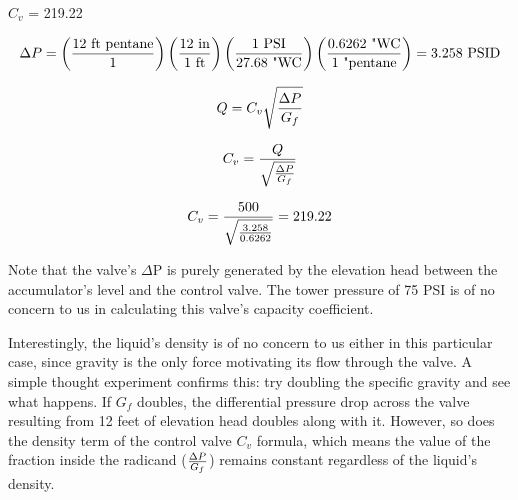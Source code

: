 





$C_v$ = 219.22
 






$$\Delta P = \left(12 \hbox{ ft pentane} \over 1 \right)  \left(12 \hbox{ in} \over 1 \hbox{ ft}\right)  \left(1 \hbox{ PSI} \over 27.68 \hbox{ "WC}\right)  \left(0.6262 \hbox{ "WC} \over 1 \hbox{ "pentane}\right) = 3.258 \hbox{ PSID}$$

$$Q = C_v \sqrt{\Delta P \over G_f}$$

$$C_v = {Q \over \sqrt{\Delta P \over G_f}}$$

$$C_v = {500 \over \sqrt{3.258 \over 0.6262}} = 219.22$$

\vskip 10pt


Note that the valve's $\Delta$P is purely generated by the elevation head between the accumulator's level and the control valve.  The tower pressure of 75 PSI is of no concern to us in calculating this valve's capacity coefficient.

Interestingly, the liquid's density is of no concern to us either in this particular case, since gravity is the only force motivating its flow through the valve.  A simple thought experiment confirms this: try doubling the specific gravity and see what happens.  If $G_f$ doubles, the differential pressure drop across the valve resulting from 12 feet of elevation head doubles along with it.  However, so does the density term of the control valve $C_v$ formula, which means the value of the fraction inside the radicand ($\Delta P \over G_f$) remains constant regardless of the liquid's density.




